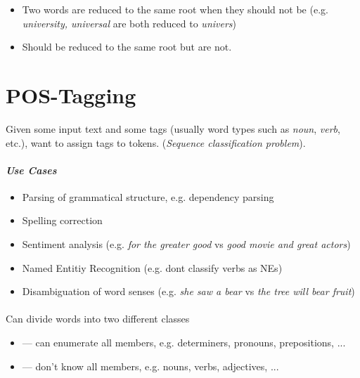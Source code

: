 \documentclass[10pt,twocolumn]{article}
\begin{document}
\begin{itemize}
\item \textbf{} Two words are reduced to the same root when
  they should not be (e.g. \textit{university, universal} are both reduced to \textit{univers})
\item \textbf{} Should be reduced to the same root but are not.
\end{itemize}


\section{POS-Tagging}

Given some input text and some tags (usually word types such as \textit{noun},
\textit{verb}, etc.), want to assign tags to tokens. (\textit{Sequence
  classification problem}).

\paragraph{\textit{Use Cases}} 
\begin{itemize}
\item Parsing of grammatical structure, e.g. dependency parsing
\item Spelling correction
\item Sentiment analysis (e.g. \textit{for the greater good} vs \textit{good
    movie and great actors})
\item Named Entitiy Recognition (e.g. dont classify verbs as NEs)
\item Disambiguation of word senses (e.g. \textit{she saw a bear} vs \textit{the
  tree will bear fruit})
\end{itemize}


\paragraph{} Can divide words into two different classes
\begin{itemize}
  \item \textbf{} --- can enumerate all members, e.g.
    determiners, pronouns, prepositions, ...
\item \textbf{} --- don't know all members, e.g. nouns, verbs,
  adjectives, ...
\end{itemize}
\end{document}
